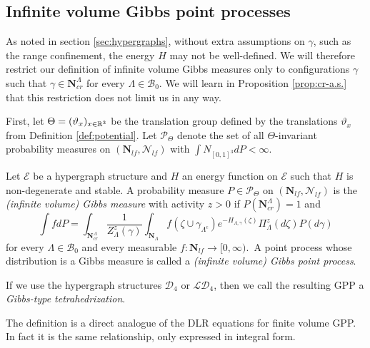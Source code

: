 

\subsection{Infinite volume Gibbs point processes}
As noted in section \ref{sec:hypergraphs}, without extra assumptions on $\gamma$, such as the range confinement, the energy $H$ may not be well-defined. We will therefore restrict our definition of infinite volume Gibbs measures only to configurations $\gamma$ such that $\gamma \in \mathbf N^\Lambda_{cr}$ for every $\Lambda \in \mathcal B_0$. We will learn in Proposition \ref{prop:cr-a.s.} that this restriction does not limit us in any way.

First, let $\Theta=(\vartheta_x)_{x\in {\mathbb R^3}}$ be the translation group defined by the translations $\vartheta_x$ from Definition \ref{def:potential}. Let $\mathcal P_\Theta$ denote the set of all $\Theta$-invariant probability measures on $(\mathbf N_{lf},\mathcal N_{lf})$ with $\int N_{[0,1]^3} dP< \infty$.

\begin{definition}\label{def:GPP}
	Let $\mathcal E$ be a hypergraph structure and $H$ an energy function on $\mathcal E$ such that $H$ is non-degenerate and stable. A probability measure $P\in \mathcal P_\Theta$ on $(\mathbf N_{lf},\mathcal N_{lf})$ is the \textit{(infinite volume) Gibbs measure} with activity $z>0$ if $P(\mathbf N^\Lambda_{cr})=1$ and
	\begin{equation}\label{eq:DLR}
		\int f dP = \int_{\mathbf N^\Lambda_{cr}} \frac 1 {Z^z_{\Lambda}(\gamma)} \int_{\mathbf N_\Lambda} f(\zeta \cup \gamma_{\Lambda^c}) e^{-H_{\Lambda,\gamma}(\zeta)} \Pi^z_\Lambda (d\zeta) P(d\gamma)
	\end{equation}
		for every $\Lambda \in \mathcal B_0$ and every measurable $f:\mathbf N_{lf} \to [0,\infty)$.\
		A point process whose distribution is a Gibbs measure is called a \textit{(infinite volume) Gibbs point process}.
\end{definition}
If we use the hypergraph structures $\mathcal D_4$ or $\mathcal {LD}_4$, then we call the resulting GPP a \textit{Gibbs-type tetrahedrization}. 

The definition is a direct analogue of the DLR equations for finite volume GPP. In fact it is the same relationship, only expressed in integral form.  \newline

